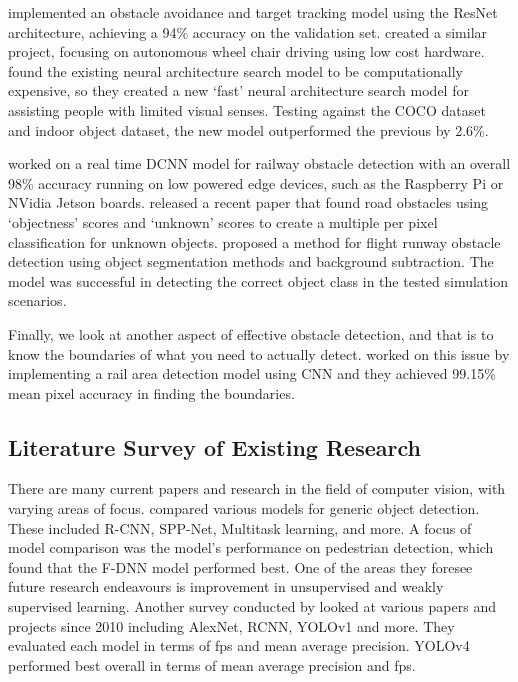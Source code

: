 \documentclass[stu,12pt,floatsintext]{apa7}
\begin{document}
\textcite{fang_computer_2021} implemented an obstacle avoidance and target tracking model using the ResNet architecture, achieving a 94\% accuracy on the validation set. \textcite{farheen_object_2022} created a similar project, focusing on autonomous wheel chair driving using low cost hardware. \textcite{said_obstacle_2023} found the existing neural architecture search model to be computationally expensive, so they created a new `fast' neural architecture search model for assisting people with limited visual senses. Testing against the COCO dataset and indoor object dataset, the new model outperformed the previous by 2.6\%.

\textcite{jenefa_real-time_2023} worked on a real time DCNN model for railway obstacle detection with an overall 98\% accuracy running on low powered edge devices, such as the Raspberry Pi or NVidia Jetson boards. \textcite{noguchi_road_2024} released a recent paper that found road obstacles using `objectness' scores and `unknown' scores to create a multiple per pixel classification for unknown objects. \textcite{andreev_runway_2021} proposed a method for flight runway obstacle detection using object segmentation methods and background subtraction. The model was successful in detecting the correct object class in the tested simulation scenarios. 

Finally, we look at another aspect of effective obstacle detection, and that is to know the boundaries of what you need to actually detect. \textcite{wang_efficient_2018} worked on this issue by implementing a rail area detection model using CNN and they achieved 99.15\% mean pixel accuracy in finding the boundaries.

\subsection{Literature Survey of Existing Research}
There are many current papers and research in the field of computer vision, with varying areas of focus. \textcite{zhao_object_2019} compared various models for generic object detection. These included R-CNN, SPP-Net, Multitask learning, and more. A focus of model comparison was the model's performance on pedestrian detection, which found that the F-DNN model \parencite{du_fused_2017} performed best.
One of the areas they foresee future research endeavours is improvement in unsupervised and weakly supervised learning. Another survey conducted by \textcite{turay_toward_2022} looked at various papers and projects since 2010 including AlexNet, RCNN, YOLOv1 and more. They evaluated each model in terms of fps and mean average precision. YOLOv4 performed best overall in terms of mean average precision and fps.
\end{document}
